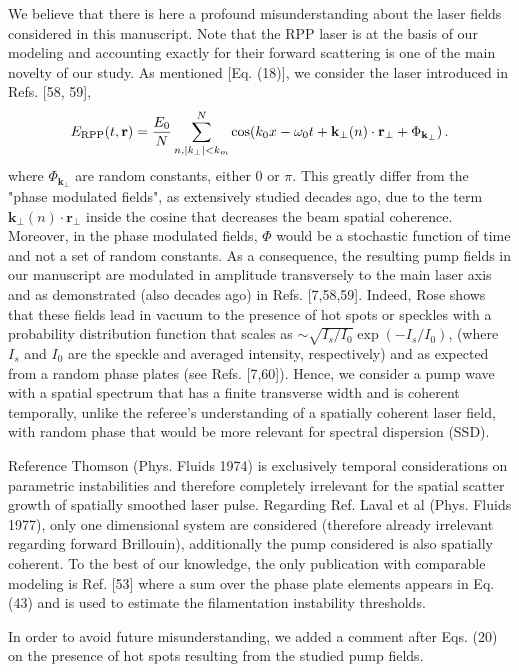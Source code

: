 \documentclass{article}
\begin{document}
We believe that there is here a profound misunderstanding about  the laser fields considered in this manuscript. Note that the RPP laser is at the basis of our modeling and accounting exactly for their forward scattering is one of the main novelty of our study.
As mentioned [Eq. (18)], we consider the  laser introduced in Refs. [58, 59], 
\begin{align}
E_{\rm RPP}(t,\mathbf{r})  = \frac{E_0}{N} \sum_{n,\vert k_{\perp}\vert<k_m }^N  \cos(k_0x - \omega_0t +\mathbf{k}_\perp(n) \cdot \mathbf{r}_\perp +\Phi_{\mathbf{k}_\perp})\, . \label{eq:erpp}
 \end{align}
where $\Phi_{\mathbf{k}_\perp}$ are random constants, either $0$ or $\pi$.
This greatly differ from the "phase modulated fields", as extensively studied decades ago, due to the term $\mathbf{k}_\perp(n) \cdot \mathbf{r}_\perp $ inside the cosine that decreases the beam spatial coherence. Moreover, in the phase modulated fields, $\Phi$ would be a stochastic function of time and not a set of random constants.  
As a consequence, the resulting pump fields in our manuscript are modulated in amplitude transversely to the main laser axis and as demonstrated   (also decades ago) in Refs. [7,58,59]. Indeed, Rose shows that these fields lead in vacuum  to the presence of hot spots or speckles with a probability distribution function that scales as $\sim\sqrt{I_s/I_0}\exp(-I_s/I_0) $, (where $I_s$ and $I_0$ are the speckle and averaged intensity, respectively) and as expected from a random phase plates (see Refs. [7,60]). 
Hence, we consider a pump wave with a spatial spectrum that has a finite transverse width and is coherent temporally, unlike the referee's understanding of a  spatially coherent laser field, with random phase that would be more relevant for spectral dispersion (SSD). 

Reference Thomson (Phys. Fluids 1974) is exclusively temporal considerations on parametric instabilities and therefore completely irrelevant for the spatial scatter growth  of spatially smoothed laser pulse. Regarding Ref. Laval et al (Phys. Fluids 1977), only one dimensional system are considered (therefore already irrelevant regarding forward Brillouin), additionally the pump considered is also spatially coherent.
To the best of our knowledge, the only publication with comparable modeling is Ref. [53] where a sum over the phase plate elements appears in  Eq. (43) and is used to estimate the filamentation  instability thresholds.

In order to avoid future misunderstanding, we added a comment after Eqs. (20) on the presence of hot spots resulting from the studied pump fields.
\end{document}
